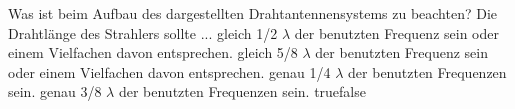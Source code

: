     {Was ist beim Aufbau des dargestellten Drahtantennensystems zu beachten? Die Drahtlänge des Strahlers sollte ...}
    {gleich 1/2 $\lambda$ der benutzten Frequenz sein oder einem Vielfachen davon entsprechen.}
    {gleich 5/8 $\lambda$ der benutzten Frequenz sein oder einem Vielfachen davon entsprechen.}
    {genau 1/4 $\lambda$ der benutzten Frequenzen sein.}
    {genau 3/8 $\lambda$ der benutzten Frequenzen sein.}
    {true}{false}